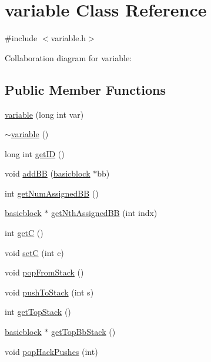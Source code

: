 \hypertarget{classvariable}{
\section{variable Class Reference}
\label{classvariable}
}


{\ttfamily \#include $<$variable.h$>$}



Collaboration diagram for variable:
\subsection*{Public Member Functions}
\begin{DoxyCompactItemize}
\item 
\hyperlink{classvariable_a0eaf13bf7764096058482fc8573673bb}{variable} (long int var)
\item 
\hyperlink{classvariable_a0d4f33ab2b101379df069ff881c4c03f}{$\sim$variable} ()
\item 
long int \hyperlink{classvariable_a1134c24e98e73b266b91d02eb253e031}{getID} ()
\item 
void \hyperlink{classvariable_acab6f948f07a2935c12917a4a2a8c46a}{addBB} (\hyperlink{classbasicblock}{basicblock} $\ast$bb)
\item 
int \hyperlink{classvariable_a53fb79e20c7ca14c872830461025c11c}{getNumAssignedBB} ()
\item 
\hyperlink{classbasicblock}{basicblock} $\ast$ \hyperlink{classvariable_a651a5439b34d9eae8ceacca7ecbfc3e8}{getNthAssignedBB} (int indx)
\item 
int \hyperlink{classvariable_a57838c6bf0ac170ee02a0e3a099aec35}{getC} ()
\item 
void \hyperlink{classvariable_ac570372e439e2d75875b8b2253069ce6}{setC} (int c)
\item 
void \hyperlink{classvariable_a0d0cee61944333e78fecef0365d35cbe}{popFromStack} ()
\item 
void \hyperlink{classvariable_ae0d9d0c11701ccb08719cb5f27fa75e4}{pushToStack} (int s)
\item 
int \hyperlink{classvariable_a3f153f4bceb60929467548bd8885d61e}{getTopStack} ()
\item 
\hyperlink{classbasicblock}{basicblock} $\ast$ \hyperlink{classvariable_a3c88482acd58a7f9f38b5467d6edcff7}{getTopBbStack} ()
\item 
void \hyperlink{classvariable_aefa98b50d2a3135fe1141621f6f5d995}{popHackPushes} (int)
\end{DoxyCompactItemize}
